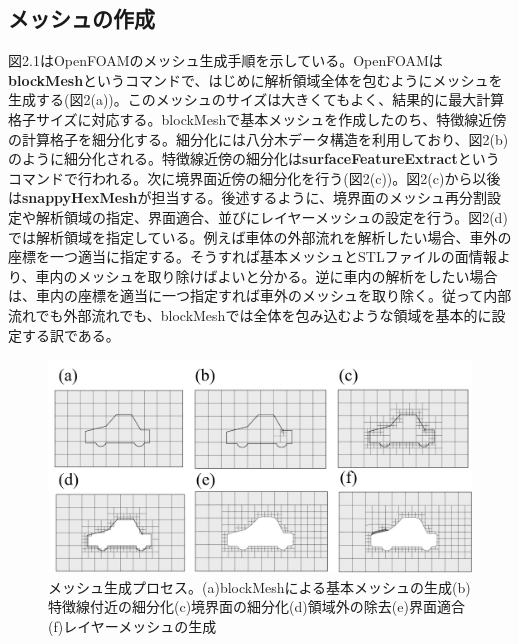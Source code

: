 \documentclass[dvipdfmx, 9pt, a4paper]{jsarticle}
\numberwithin{equation}{section}
\begin{document}
\subsection{メッシュの作成}
図2.1はOpenFOAMのメッシュ生成手順を示している。OpenFOAMは{\bf blockMesh}というコマンドで、はじめに解析領域全体を包むようにメッシュを生成する(図2(a))。このメッシュのサイズは大きくてもよく、結果的に最大計算格子サイズに対応する。blockMeshで基本メッシュを作成したのち、特徴線近傍の計算格子を細分化する。細分化には八分木データ構造を利用しており、図2(b)のように細分化される。特徴線近傍の細分化は{\bf surfaceFeatureExtract}というコマンドで行われる。次に境界面近傍の細分化を行う(図2(c))。図2(c)から以後は{\bf snappyHexMesh}が担当する。後述するように、境界面のメッシュ再分割設定や解析領域の指定、界面適合、並びにレイヤーメッシュの設定を行う。図2(d)では解析領域を指定している。例えば車体の外部流れを解析したい場合、車外の座標を一つ適当に指定する。そうすれば基本メッシュとSTLファイルの面情報より、車内のメッシュを取り除けばよいと分かる。逆に車内の解析をしたい場合は、車内の座標を適当に一つ指定すれば車外のメッシュを取り除く。従って内部流れでも外部流れでも、blockMeshでは全体を包み込むような領域を基本的に設定する訳である。
\begin{figure}[t]
\begin{center}
\includegraphics[width=12cm]{./pic/fig1.png}
\caption{メッシュ生成プロセス。(a)blockMeshによる基本メッシュの生成(b)特徴線付近の細分化(c)境界面の細分化(d)領域外の除去(e)界面適合(f)レイヤーメッシュの生成}
\end{center}
\end{figure}
\end{document}
